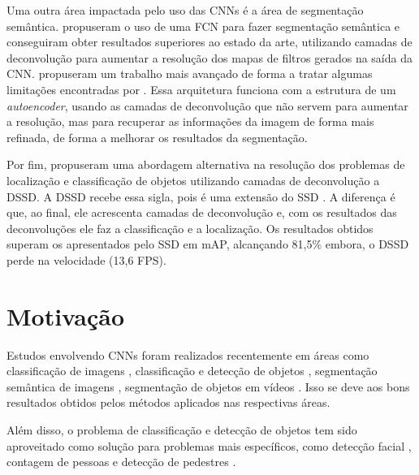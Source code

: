 Uma outra área impactada pelo uso das \ac{CNN}s é a área de segmentação semântica.  propuseram o uso de uma \ac{FCN} para fazer segmentação semântica e conseguiram obter resultados superiores ao estado da arte, utilizando camadas de deconvolução para aumentar a resolução dos mapas de filtros gerados na saída da \ac{CNN}.  propuseram um trabalho mais avançado de forma a tratar algumas limitações encontradas por . Essa arquitetura funciona com a estrutura de um \textit{autoencoder}, usando as camadas de deconvolução que não servem para aumentar a resolução, mas para recuperar as informações da imagem de forma mais refinada, de forma a melhorar os resultados da segmentação.

Por fim,  propuseram uma abordagem alternativa na resolução dos problemas de localização e classificação de objetos utilizando camadas de deconvolução a \ac{DSSD}. A \ac{DSSD} recebe essa sigla, pois é uma extensão do \ac{SSD} \cite{wei-2015}. A diferença é que, ao final, ele acrescenta camadas de deconvolução e, com os resultados das deconvoluções ele faz a classificação e a localização. Os resultados obtidos superam os apresentados pelo \ac{SSD} em \ac{mAP}, alcançando 81,5\% embora, o  \ac{DSSD} perde na velocidade (13,6 FPS). 


\section{Motivação}
\label{secao:1:1}

Estudos envolvendo \ac{CNN}s foram realizados recentemente em áreas como classificação de imagens \cite{krizhevsky-2012, simonyan-2014}, classificação e detecção de objetos \cite{cheng-2017, lin-2014}, segmentação semântica de imagens \cite{long-2014, noh:2015}, segmentação de objetos em vídeos \cite{caelles-2017, voigtlaender-2017}. Isso se deve aos bons resultados obtidos pelos métodos aplicados nas respectivas áreas.

Além disso, o problema de classificação e detecção de objetos tem sido aproveitado como solução para problemas mais específicos, como detecção facial \cite{yang-2018}, contagem de pessoas \cite{pren-2017} e detecção de pedestres \cite{lan-2018}. 

